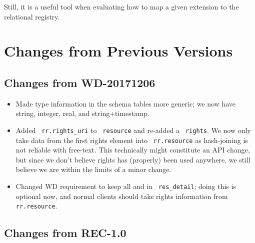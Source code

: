 \documentclass[11pt,a4paper]{ivoa}
\newcommand{\rtent}[1]{\texttt{\color{rtcolor} #1}}
\begin{document}
Still, it is a useful tool when evaluating how to map a given extension
to the relational registry.





\section{Changes from Previous Versions}

\label{changes}

\subsection{Changes from WD-20171206}

\begin{itemize}
\item Made type information in the schema tables more generic; we now
have string, integer, real, and string+timestamp.
\item Added \rtent{rr.rights\_uri} to \rtent{resource} and re-added a
\rtent{rights}.  We now only take data from the first rights element
into \rtent{rr.resource} as hash-joining is not reliable with free-text.
This technically might constitute an API change, but since we don't
believe rights has (properly) been used anywhere, we still believe we are
within the limits of a minor change.
\item  Changed WD requirement to keep all  and
 in \rtent{res\_detail}; doing this is optional now,
and normal clients should take rights information from
\rtent{rr.resource}.
\end{itemize}

\subsection{Changes from REC-1.0}
\end{document}
